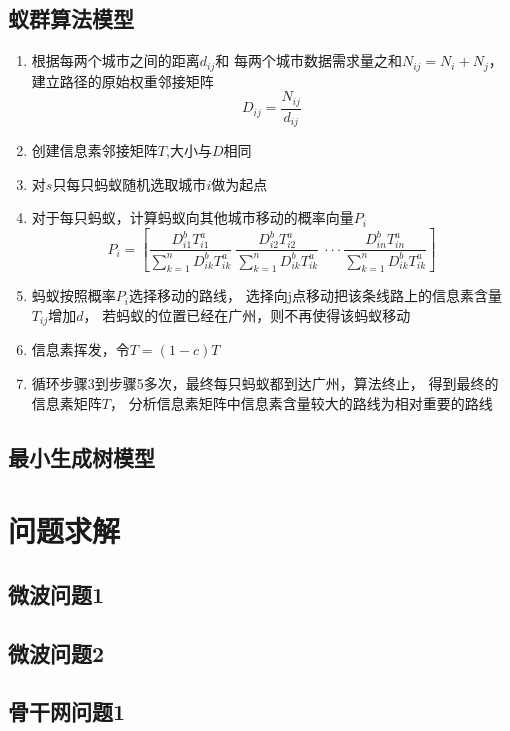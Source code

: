 \documentclass[UTF8,12pt]{ctexart}
\begin{document}
    \subsection{蚁群算法模型}\label{YQSFMX}
        \begin{enumerate}
            \item 根据每两个城市之间的距离$d_{ij}$和
            每两个城市数据需求量之和$N_{ij}=N_i+N_j$，建立路径的原始权重邻接矩阵
            $$D_{ij}=\frac{N_{ij}}{d_{ij}}$$
            \item 创建信息素邻接矩阵$T$,大小与$D$相同
            \item 对$s$只每只蚂蚁随机选取城市$i$做为起点
            \item 对于每只蚂蚁，计算蚂蚁向其他城市移动的概率向量$P_i$
            $$P_i=\left[\frac{D_{i1}^bT_{i1}^a}{\sum_{k=1}^n{D_{ik}^bT_{ik}^a}}~\frac{D_{i2}^bT_{i2}^a}{\sum_{k=1}^n{D_{ik}^bT_{ik}^a}}~··· \frac{D_{in}^bT_{in}^a}{\sum_{k=1}^n{D_{ik}^bT_{ik}^a}}\right]$$
            \item 蚂蚁按照概率$P_i$选择移动的路线，
                选择向j点移动把该条线路上的信息素含量$T_{ij}$增加$d$，
                若蚂蚁的位置已经在广州，则不再使得该蚂蚁移动
            \item 信息素挥发，令$T=(1-c)T$
            \item 循环步骤3到步骤5多次，最终每只蚂蚁都到达广州，算法终止，
            得到最终的信息素矩阵$T$，
            分析信息素矩阵中信息素含量较大的路线为相对重要的路线
        \end{enumerate}

    \subsection{最小生成树模型}\label{ZXSCSMX}
 




\section{问题求解}
    \subsection{微波问题1}
    \subsection{微波问题2}
    \subsection{骨干网问题1}
\end{document}
